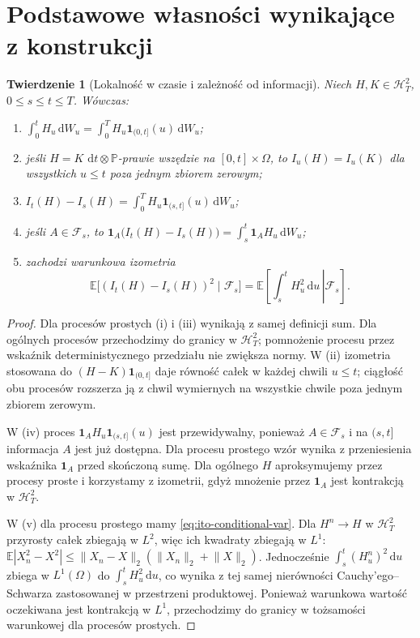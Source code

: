 \documentclass[11pt,a4paper,oneside]{report}
\numberwithin{equation}{chapter}
\theoremstyle{plain}
\newtheorem{twierdzenie}{Twierdzenie}[chapter]
\theoremstyle{definition}
\theoremstyle{remark}
\newcommand{\Prob}{\mathbb{P}}
\newcommand{\E}{\mathbb{E}}
\newcommand{\calF}{\mathcal{F}}
\newcommand{\calH}{\mathcal{H}}
\newcommand{\ind}[1]{\mathbf{1}_{#1}}
\newcommand{\dd}{\mathrm{d}}
\newcommand{\norm}[1]{\lVert #1\rVert}
\begin{document}
\section{Podstawowe własności wynikające z konstrukcji}
\begin{twierdzenie}[Lokalność w czasie i zależność od informacji]
\label{th:ito-properties}
Niech $H,K\in\calH_T^2$, $0\le s\le t\le T$.
Wówczas:
\begin{enumerate}[label=\textup{(\roman*)}]
\item $\displaystyle\int_0^tH_u\,\dd W_u
=\int_0^T H_u\ind{(0,t]}(u)\,\dd W_u$;
\item jeśli $H=K$ $\dd t\otimes\Prob$-prawie wszędzie
na $[0,t]\times\Omega$, to $I_u(H)=I_u(K)$ dla wszystkich
$u\le t$ poza jednym zbiorem zerowym;
\item $\displaystyle I_t(H)-I_s(H)=\int_0^TH_u\ind{(s,t]}(u)\,\dd W_u$;
\item jeśli $A\in\calF_s$, to
$\displaystyle\ind A\big(I_t(H)-I_s(H)\big)
=\int_s^t\ind A H_u\,\dd W_u$;
\item zachodzi warunkowa izometria
\[
\E\big[(I_t(H)-I_s(H))^2\mid\calF_s\big]
=\E\left[\left.\int_s^tH_u^2\,\dd u\,\right|\calF_s\right].
\]
\end{enumerate}
\end{twierdzenie}
\begin{proof}
Dla procesów prostych (i) i (iii) wynikają z samej
definicji sum. Dla ogólnych procesów przechodzimy
do granicy w $\calH_T^2$; pomnożenie procesu przez
wskaźnik deterministycznego przedziału nie zwiększa
normy. W (ii) izometria stosowana do $(H-K)\ind{(0,t]}$
daje równość całek w każdej chwili $u\le t$;
ciągłość obu procesów rozszerza ją z chwil wymiernych
na wszystkie chwile poza jednym zbiorem zerowym.

W (iv) proces $\ind A H_u\ind{(s,t]}(u)$ jest
przewidywalny, ponieważ $A\in\calF_s$ i na
$(s,t]$ informacja $A$ jest już dostępna. Dla procesu
prostego wzór wynika z przeniesienia wskaźnika $\ind A$
przed skończoną sumę. Dla ogólnego $H$ aproksymujemy
przez procesy proste i korzystamy z izometrii,
gdyż mnożenie przez $\ind A$ jest kontrakcją
w $\calH_T^2$.

W (v) dla procesu prostego mamy \eqref{eq:ito-conditional-var}.
Dla $H^n\to H$ w $\calH_T^2$ przyrosty całek
zbiegają w $L^2$, więc ich kwadraty zbiegają w $L^1$:
$\E|X_n^2-X^2|\le\norm{X_n-X}_2(\norm{X_n}_2+\norm X_2)$.
Jednocześnie $\int_s^t(H_u^n)^2\,\dd u$ zbiega
w $L^1(\Omega)$ do $\int_s^tH_u^2\,\dd u$,
co wynika z tej samej nierówności Cauchy'ego--Schwarza
zastosowanej w przestrzeni produktowej.
Ponieważ warunkowa wartość oczekiwana jest kontrakcją
w $L^1$, przechodzimy do granicy w tożsamości
warunkowej dla procesów prostych.
\end{proof}
\end{document}
